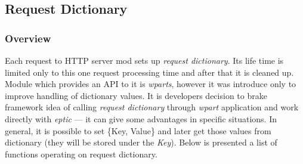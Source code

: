 \subsection{Request Dictionary}
\subsubsection{Overview}
Each request to HTTP server mod sets up \textit{request dictionary}. Its life time
is limited only to this one request processing time and after that it is cleaned up. 
Module which provides an API to it is {\it wparts}, however it was introduce
only to improve handling of dictionary values. It is developers decision to
brake framework idea of calling \emph{request dictionary} through \emph{wpart}
application and work directly with \emph{eptic} --- it can give some
advantages in specific situations. 
In general, it is possible to set 
\{Key, Value\} and later get those values from dictionary (they will be stored under 
the {\it Key}). Below is presented a list of functions operating on request
dictionary. 

